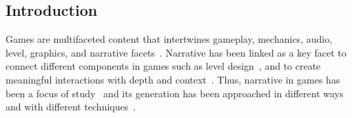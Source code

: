 \subsection{Introduction}








Games are multifaceted content that intertwines gameplay, mechanics, audio, level, graphics, and narrative facets~. Narrative has been linked as a key facet to connect different components in games such as level design~, and to create meaningful interactions with depth and context~. Thus, narrative in games has been a focus of study~ and its generation has been approached in different ways and with different techniques~.

